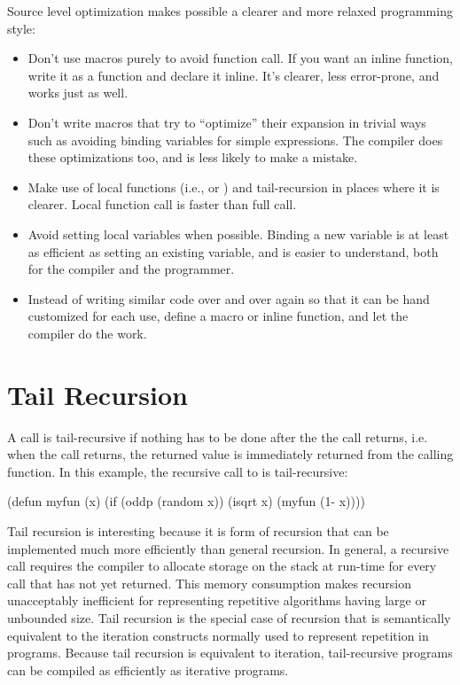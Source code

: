 Source level optimization makes possible a clearer and more relaxed programming
style:
\begin{itemize}
  
\item Don't use macros purely to avoid function call.  If you want an
  inline function, write it as a function and declare it inline.  It's
  clearer, less error-prone, and works just as well.
  
\item Don't write macros that try to ``optimize'' their expansion in
  trivial ways such as avoiding binding variables for simple
  expressions.  The compiler does these optimizations too, and is less
  likely to make a mistake.
  
\item Make use of local functions (i.e.,  or )
  and tail-recursion in places where it is clearer.  Local function
  call is faster than full call.
  
\item Avoid setting local variables when possible.  Binding a new
   variable is at least as efficient as setting an existing
  variable, and is easier to understand, both for the compiler and the
  programmer.
  
\item Instead of writing similar code over and over again so that it
  can be hand customized for each use, define a macro or inline
  function, and let the compiler do the work.
\end{itemize}


\section{Tail Recursion}
\label{tail-recursion}

A call is tail-recursive if nothing has to be done after the the call
returns, i.e. when the call returns, the returned value is immediately
returned from the calling function.  In this example, the recursive
call to  is tail-recursive:
\begin{lisp}
(defun myfun (x)
  (if (oddp (random x))
      (isqrt x)
      (myfun (1- x))))
\end{lisp}

Tail recursion is interesting because it is form of recursion that can be
implemented much more efficiently than general recursion.  In general, a
recursive call requires the compiler to allocate storage on the stack at
run-time for every call that has not yet returned.  This memory consumption
makes recursion unacceptably inefficient for representing repetitive algorithms
having large or unbounded size.  Tail recursion is the special case of
recursion that is semantically equivalent to the iteration constructs normally
used to represent repetition in programs.  Because tail recursion is equivalent
to iteration, tail-recursive programs can be compiled as efficiently as
iterative programs.

